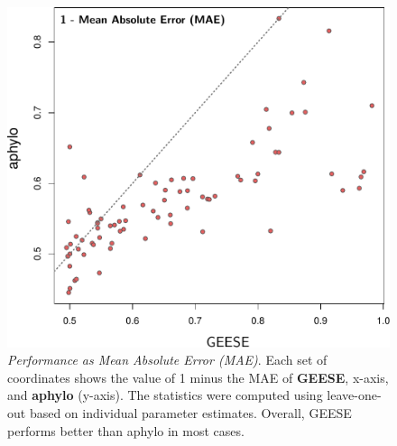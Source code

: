 \documentclass[aspectratio=169, 9pt]{beamer}
\begin{document}
\begin{frame}
	\begin{figure}
		\includegraphics[width=.45\linewidth]{geese-vs-aphylo-one-at-a-time.pdf}
		\caption{\textit{Performance as Mean Absolute Error (MAE)}. Each set of coordinates shows the value of 1 minus the MAE of \textbf{GEESE}, x-axis, and \textbf{aphylo} (y-axis). The statistics were computed using leave-one-out based on individual parameter estimates. Overall, GEESE performs better than aphylo in most cases.}
	\end{figure}
\end{frame}
\end{document}
